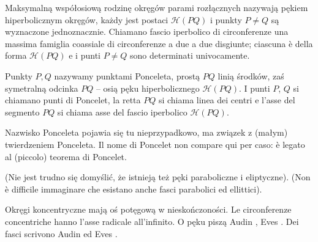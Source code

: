 Maksymalną współosiową rodzinę okręgów parami rozłącznych nazywają pękiem hiperbolicznym okręgów, każdy jest postaci $\mathcal H(PQ)$ i punkty $P \neq Q$ są wyznaczone jednoznacznie. %
Chiamano fascio iperbolico di circonferenze una massima famiglia coassiale di circonferenze a due a due disgiunte; ciascuna è della forma $\mathcal H(PQ)$ e i punti $P \neq Q$ sono determinati univocamente. %

\begin{definition}
	Punkty $P, Q$ nazywamy punktami Ponceleta, prostą $PQ$ linią środków, zaś symetralną odcinka $PQ$ -- osią pęku hiperbolicznego $\mathcal H(PQ)$. %
	I punti $P$, $Q$ si chiamano punti di Poncelet, la retta $PQ$ si chiama linea dei centri e l'asse del segmento $PQ$ si chiama asse del fascio iperbolico $\mathcal H(PQ)$. %
\end{definition}

Nazwisko Ponceleta pojawia się tu nieprzypadkowo, ma związek z (małym) twierdzeniem Ponceleta. %
Il nome di Poncelet non compare qui per caso: è legato al (piccolo) teorema di Poncelet. %

(Nie jest trudno się domyślić, że istnieją też pęki paraboliczne i eliptyczne). %
(Non è difficile immaginare che esistano anche fasci parabolici ed ellittici). %


Okręgi koncentryczne mają oś potęgową w nieskończoności. %
Le circonferenze concentriche hanno l'asse radicale all'infinito. %
O pęku piszą Audin \cite[s. 92-98]{audin_2003}, Eves \cite[s. 94]{eves1_1972}. %
Dei fasci scrivono Audin \cite[p. 92--98]{audin_2003} ed Eves \cite[p. 94]{eves1_1972}. %

%